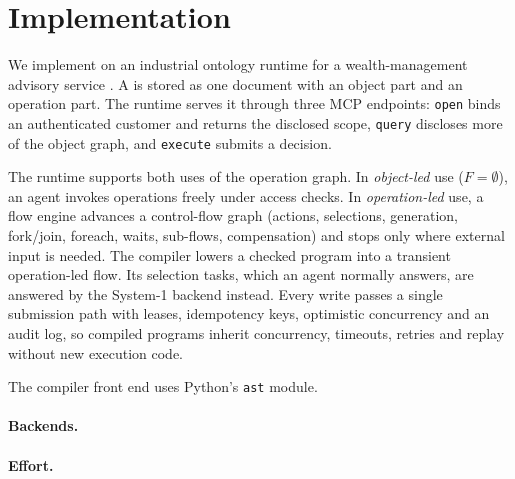 \section{Implementation}
\label{sec:implementation}

We implement \jif on an industrial ontology runtime for a wealth-management advisory service . A \sog is stored as one document with an object part and an operation part. The runtime serves it through three MCP endpoints: \texttt{open} binds an authenticated customer and returns the disclosed scope, \texttt{query} discloses more of the object graph, and \texttt{execute} submits a decision.

The runtime supports both uses of the operation graph. In \emph{object-led} use ($F=\emptyset$), an agent invokes operations freely under access checks. In \emph{operation-led} use, a flow engine advances a control-flow graph (actions, selections, generation, fork/join, foreach, waits, sub-flows, compensation) and stops only where external input is needed. The compiler lowers a checked \pyif program into a transient operation-led flow. Its selection tasks, which an agent normally answers, are answered by the System-1 backend instead. Every write passes a single submission path with leases, idempotency keys, optimistic concurrency and an audit log, so compiled programs inherit concurrency, timeouts, retries and replay without new execution code.

The compiler front end uses Python's \texttt{ast} module. 

\paragraph{Backends.} 
\paragraph{Effort.} 
